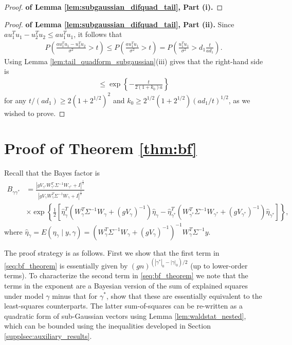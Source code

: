 \begin{proof} {\bf of Lemma \ref{lem:subgaussian_difquad_tail}, Part (i).}
\end{proof}



\begin{proof} {\bf of Lemma \ref{lem:subgaussian_difquad_tail}, Part (ii).}
Since $a u_1^Tu_1 - u_2^Tu_2 \leq a u_1^T u_1$, it follows that
\begin{align}
  P\left( \frac{a u_1^Tu_1 - u_2^Tu_2}{\sigma^2} > t \right) \leq  
P\left( \frac{a u_1^Tu_1}{\sigma^2} > t \right)
=P\left( \frac{u_1^Tu_1}{\sigma^2} > d_1 \frac{t}{a d_1} \right).
\nonumber
\end{align}
Using Lemma \ref{lem:tail_quadform_subgaussian}(iii) gives that the right-hand side is
\begin{align}
\leq \exp \left\{ -\frac{t}{2 (1+k_0) a} \right\} 
\nonumber
\end{align}
for any $t/(ad_1) \geq 2(1+2^{1/2})^2$ and $k_0 \geq 2^{1/2}(1+2^{1/2}) (a d_1/t)^{1/2}$, as we wished to prove.
\end{proof}






\newpage
\section{Proof of Theorem \ref{thm:bf}}
\label{supplsec:proof_bf}

Recall that the Bayes factor is
\begin{align}
 B_{\gamma \gamma^*}&=
\frac{\left|g V_{\gamma^*} W_{\gamma^*}^T \Sigma^{-1} W_{\gamma^*}  + I \right|^{\frac{1}{2}}}{\left| g V_{\gamma} W_{\gamma}^T \Sigma^{-1} W_\gamma  + I \right|^{\frac{1}{2}}}
\nonumber \\
&\times \exp \left\{  \frac{1}{2} \left[ \hat{\eta}_\gamma^T ( W_\gamma^T \Sigma^{-1} W_\gamma + (g V_\gamma)^{-1}) \hat{\eta}_\gamma 
- \hat{\eta}_{\gamma^*}^T ( W_{\gamma^*}^T \Sigma^{-1} W_{\gamma^*} + (g V_{\gamma^*})^{-1}) \hat{\eta}_{\gamma^*}
\right] \right\},
\label{seq:bf_theorem}
\end{align}
where $\hat{\eta}_\gamma= E(\eta_\gamma \mid y,\gamma)= (W_\gamma^T \Sigma^{-1} W_\gamma + (g V_\gamma)^{-1})^{-1} W_\gamma^T \Sigma^{-1} y$.

The proof strategy is as follows. First we show that the first term in \eqref{seq:bf_theorem} is essentially given by $(g n)^{(|\gamma^*|_0 - |\gamma|_0)/2}$ (up to lower-order terms). To characterize the second term in \eqref{seq:bf_theorem} we note that the terms in the exponent are 
a Bayesian version of the sum of explained squares under model $\gamma$ minus that for $\gamma^*$, show that these are essentially equivalent to the least-squares counterparts. The latter sum-of-squares can be re-written as a quadratic form of sub-Gaussian vectors using Lemma \ref{lem:waldstat_nested}, which can be bounded using the inequalities developed in Section \ref{supplsec:auxiliary_results}.


